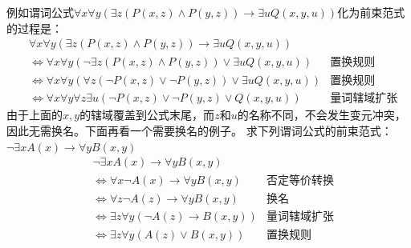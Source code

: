 \documentclass[lang=cn,11pt]{elegantbook}
\begin{document}
例如谓词公式$\forall x\forall y(\exists z(P(x,z)\land P(y,z))\to\exists uQ(x,y,u))$化为前束范式的过程是：
\begin{align*}
&\forall x\forall y(\exists z(P(x,z)\land P(y,z))\to\exists uQ(x,y,u))\\
&\Leftrightarrow \forall x\forall y(\neg\exists z(P(x,z)\land P(y,z))\lor\exists uQ(x,y,u))&\text{置换规则}\\
&\Leftrightarrow \forall x\forall y(\forall z(\neg P(x,z)\lor\neg P(y,z))\lor\exists uQ(x,y,u))&\text{置换规则}\\
&\Leftrightarrow \forall x\forall y\forall z\exists u(\neg P(x,z)\lor\neg P(y,z)\lor Q(x,y,u))&\text{量词辖域扩张}
\end{align*}
由于上面的$x,y$的辖域覆盖到公式末尾，而$z$和$u$的名称不同，不会发生变元冲突，因此无需换名。下面再看一个需要换名的例子。
求下列谓词公式的前束范式：$\neg\exists xA(x)\to\forall yB(x,y)$
\begin{align*}
    &\neg\exists xA(x)\to\forall yB(x,y)\\
    &\Leftrightarrow \forall x\neg A(x)\to\forall yB(x,y)&\text{否定等价转换}\\
    &\Leftrightarrow \forall z\neg A(z)\to\forall yB(x,y)&\text{换名}\\
    &\Leftrightarrow \exists z\forall y(\neg A(z)\to B(x,y))&\text{量词辖域扩张}\\
    &\Leftrightarrow \exists z\forall y(A(z)\lor B(x,y))&\text{置换规则}
\end{align*}
\end{document}
